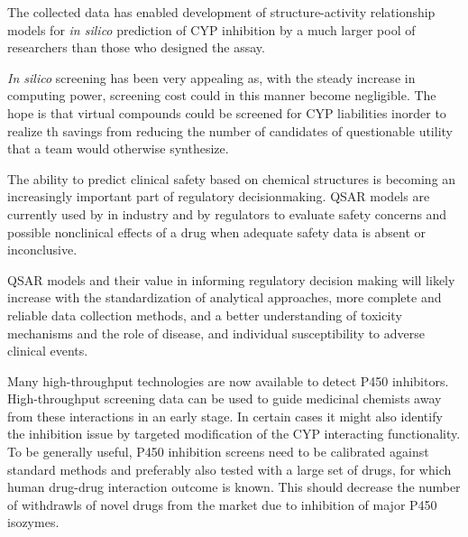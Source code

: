 The collected data has enabled development of structure-activity relationship models for \textit{in silico} prediction of CYP inhibition by a much larger pool of researchers than those who designed the assay.


\textit{In silico} screening has been very appealing as, with the steady increase in computing power, screening cost could in this manner become negligible. The hope is that virtual compounds could be screened for CYP liabilities inorder to realize th savings from reducing the number of candidates of questionable utility that a team would otherwise synthesize.\cite{Zlokarnik2005}




The ability to predict clinical safety based on chemical structures is becoming an increasingly important part of regulatory decisionmaking. QSAR models are currently used by in industry and by regulators to evaluate safety concerns and possible nonclinical effects of a drug when adequate safety data is absent or inconclusive.\cite{Kruhlak2012}

QSAR models and their value in informing regulatory decision making will likely increase with the standardization of analytical approaches, more complete and reliable data collection methods, and a better understanding of toxicity mechanisms and the role of disease, and individual susceptibility to adverse clinical events.\cite{Kruhlak2012}

Many high-throughput technologies are now available to detect P450 inhibitors. High-throughput screening data can be used to guide medicinal chemists away from these interactions in an early stage. In certain cases it might also identify the inhibition issue by targeted modification of the CYP interacting functionality. To be generally useful, P450 inhibition screens need to be calibrated against standard methods and preferably also tested with a large set of drugs, for which human drug-drug interaction outcome is known. \cite{Zlokarnik2005} This should decrease the number of withdrawls of novel drugs from the market due to inhibition of major P450 isozymes.

